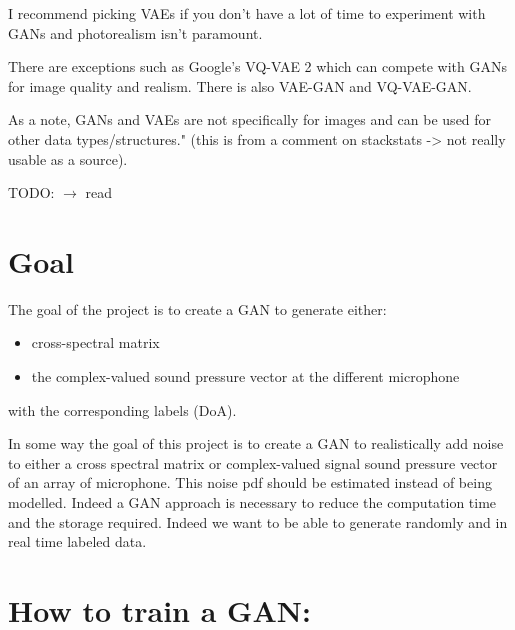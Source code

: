 \documentclass{article}
\begin{document}
I recommend picking VAEs if you don’t have a lot of time to experiment with GANs and photorealism isn’t paramount.

There are exceptions such as Google’s VQ-VAE 2 which can compete with GANs for image quality and realism. There is also VAE-GAN and VQ-VAE-GAN.

As a note, GANs and VAEs are not specifically for images and can be used for other data types/structures." (this is from a comment on stackstats -> not really usable as a source).

TODO: $\rightarrow$ read \cite{10.1007/978-3-030-38961-1_8}



\section{Goal}

The goal of the project is to create a GAN to generate either:
\begin{itemize}
    \item cross-spectral matrix
    \item the complex-valued sound pressure vector at the different microphone
\end{itemize}
with the corresponding labels (DoA).

In some way the goal of this project is to create a GAN to realistically add noise to either a cross spectral matrix or complex-valued signal sound pressure vector of an array of microphone. This noise pdf should be estimated instead of being modelled. Indeed a GAN approach is necessary to reduce the computation time and the storage required. Indeed we want to be able to generate randomly and in real time labeled data.  

\section{How to train a GAN:}
\end{document}
